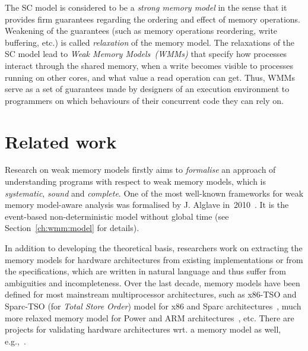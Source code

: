 The SC model is considered to be a \textit{strong memory model} in the sense that it provides firm guarantees regarding the ordering and effect of memory operations.
Weakening of the guarantees (such as memory operations reordering, write buffering, etc.) is called \textit{relaxation} of the memory model.
The relaxations of the SC model lead to \textit{Weak Memory Models~(WMMs)} that specify how processes interact through the shared memory, when a write becomes visible to processes running on other cores, and what value a read operation can get.
Thus, WMMs serve as a set of guarantees made by designers of an execution environment to programmers on which behaviours of their concurrent code they can rely on.

\ifdefined\IsAalto
\else
  \vspace*{1em}
\fi
\section{Related work}
\label{ch:intro:related}

Research on weak memory models firstly aims to \textit{formalise} an approach of understanding programs with respect to weak memory models, which is \textit{systematic}, \textit{sound} and \textit{complete}.
One of the most well-known frameworks for weak memory model-aware analysis was formalised by J. Alglave in~2010~\cite{alglave2010shared}.
It is the event-based non-deterministic model without global time (see Section~\ref{ch:wmm:model} for details).

In addition to developing the theoretical basis, researchers work on extracting the memory models for hardware architectures from existing implementations or from the specifications, which are written in natural language and thus suffer from ambiguities and incompleteness.
Over the last decade, memory models have been defined for most mainstream multiprocessor architectures, such as x86-TSO and Sparc-TSO (for \textit{Total Store Order}) model for x86 and Sparc architectures~\cite{owens2009better}, much more relaxed memory model for Power and ARM architectures~\cite{alglave2009semantics,sarkar2011understanding, alglave2014herding}, etc. %
There are projects for validating hardware architectures wrt. a memory model as well, e.g.,~\cite{lustig2014pipecheck,lustig2016coatcheck}.


